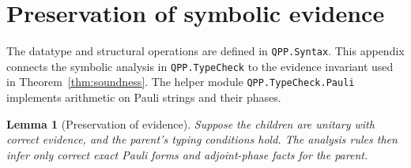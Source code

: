 \documentclass[11pt,a4paper]{article}
\newcommand{\code}[1]{\texttt{#1}}
\newtheorem{lemma}[theorem]{Lemma}
\begin{document}
\clearpage
\appendix
\section{Preservation of symbolic evidence}
\label{sec:evidence}

The datatype and structural operations are defined in \code{QPP.Syntax}.
This appendix connects the symbolic analysis in \code{QPP.TypeCheck}
to the evidence invariant used in Theorem~\ref{thm:soundness}.
The helper module \code{QPP.TypeCheck.Pauli} implements arithmetic on
Pauli strings and their phases.

\begin{lemma}[Preservation of evidence]
Suppose the children are unitary with correct evidence, and the
parent's typing conditions hold. The analysis rules then infer only
correct exact Pauli forms and adjoint-phase facts for the parent.
\label{lem:evidence}
\end{lemma}
\end{document}
